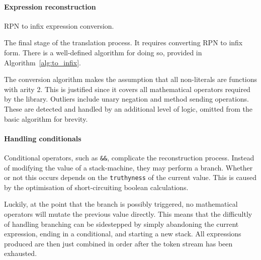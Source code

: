 \paragraph*{Expression reconstruction}

\begin{algorithm}[h]
  \caption{\ac{RPN} to infix expression conversion.}
  \label{alg:to_infix}

  \begin{algorithmic}
    \Else
    \EndIf
    \EndWhile
    \EndFunction
  \end{algorithmic}
\end{algorithm}

The final stage of the translation process. It requires converting \ac{RPN} to infix form.
There is a well-defined algorithm for doing so, provided in Algorithm~\ref{alg:to_infix}.

The conversion algorithm makes the assumption that all non-literals are functions with arity 2. This is justified since it covers all mathematical operators required by the library. Outliers include unary negation and method sending operations. These are detected and handled by an additional level of logic, omitted from the basic algorithm for brevity.

\paragraph*{Handling conditionals}
Conditional operators, such as \verb|&&|, complicate the reconstruction process. Instead of modifying the value of a stack-machine, they may perform a branch. Whether or not this occurs depends on the \verb|truthyness| of the current value. This is caused by the optimisation of short-circuiting boolean calculations.

Luckily, at the point that the branch is possibly triggered, no mathematical operators will mutate the previous value directly. This means that the difficultly of handling branching can be sidestepped by simply abandoning the current expression, ending in a conditional, and starting a new stack. All expressions produced are then just combined in order after the token stream has been exhausted.

